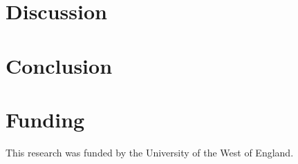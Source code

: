 \documentclass[a4paper]{article}
\begin{document}
\begin{multicols}{2}
\noindent
\begin{minipage}{\columnwidth}
\centering

\label{fig:frog_reward}
\end{minipage}

\noindent
\begin{minipage}{\columnwidth}
\centering

\label{fig:snake_reward}
\end{minipage}

\noindent
\begin{minipage}{\columnwidth}
\centering

\label{fig:biased_matching_pennies_hopper_reward}
\end{minipage}

\noindent
\begin{minipage}{\columnwidth}
\centering

\label{fig:biased_matching_pennies_frog_reward}
\end{minipage}

\section{Discussion}

\section{Conclusion}

\section*{Funding}
This research was funded by the University of the West of England.

\printbibliography

\end{multicols}
\end{document}

